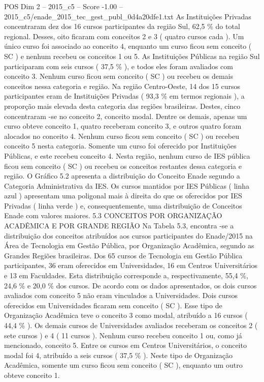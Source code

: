 \begin{textsample}{POS Dim 2 – 2015\_c5 – Score -1.00 – 2015\_c5/enade\_2015\_tec\_gest\_publ\_0d4a20dfe1.txt}
As Instituições Privadas concentraram dez dos 16 cursos participantes da região Sul, 62,5 \% do total regional.
Desses, oito ficaram com conceitos 2 e 3 ( quatro cursos cada ).
Um único curso foi associado ao conceito 4, enquanto um curso ficou sem conceito ( SC ) e nenhum recebeu os conceitos 1 ou 5.
As Instituições Públicas na região Sul participaram com seis cursos ( 37,5 \% ), e todos eles foram avaliados com conceito 3.
Nenhum curso ficou sem conceito ( SC ) ou recebeu os demais conceitos nessa categoria e região.
Na região Centro-Oeste, 14 dos 15 cursos participantes eram de Instituições Privadas ( 93,3 \% em termos regionais ), a proporção mais elevada desta categoria das regiões brasileiras.
Destes, cinco concentraram -se no conceito 2, conceito modal.
Dentre os demais, apenas um curso obteve conceito 1, quatro receberam conceito 3, e outros quatro foram alocados no conceito 4.
Nenhum curso ficou sem conceito ( SC ) ou recebeu conceito 5 nesta categoria.
Somente um curso foi oferecido por Instituições Públicas, e este recebeu conceito 4.
Nesta região, nenhum curso de IES pública ficou sem conceito ( SC ) ou recebeu os conceitos restantes dessa categoria e região.
O Gráfico 5.2 apresenta a distribuição do Conceito Enade segundo a Categoria Administrativa da IES.
Os cursos mantidos por IES Públicas ( linha azul ) apresentam uma poligonal mais à direita do que os oferecidos por IES Privadas ( linha verde ) e, consequentemente, uma distribuição de Conceitos Enade com valores maiores. 5.3 CONCEITOS POR ORGANIZAÇÃO ACADÊMICA E POR GRANDE REGIÃO Na Tabela 5.3, encontra -se a distribuição dos conceitos atribuídos aos cursos participantes do Enade/2015 na Área de Tecnologia em Gestão Pública, por Organização Acadêmica, segundo as Grandes Regiões brasileiras.
Dos 65 cursos de Tecnologia em Gestão Pública participantes, 36 eram oferecidos em Universidades, 16 em Centros Universitários e 13 em Faculdades.
Esta distribuição corresponde a, respectivamente, 55,4 \%, 24,6 \% e 20,0 \% dos cursos.
De acordo com os dados apresentados, os dois cursos avaliados com conceito 5 não eram vinculados a Universidades.
Dois cursos oferecidos em Universidades ficaram sem conceito ( SC ).
Esse tipo de Organização Acadêmica teve o conceito 3 como modal, atribuído a 16 cursos ( 44,4 \% ).
Os demais cursos de Universidades avaliados receberam os conceitos 2 ( sete cursos ) e 4 ( 11 cursos ).
Nenhum curso recebeu conceito 1 ou, como já mencionado, conceito 5.
Entre os cursos em Centros Universitários, o conceito modal foi 4, atribuído a seis cursos ( 37,5 \% ).
Neste tipo de Organização Acadêmica, somente um curso ficou sem conceito ( SC ), enquanto um outro obteve conceito 1.

\end{textsample}
